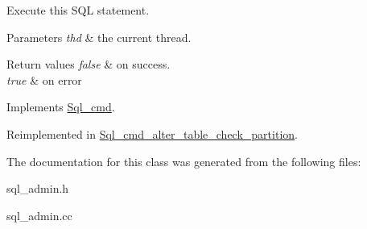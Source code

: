 Execute this S\+QL statement. 
\begin{DoxyParams}{Parameters}
{\em thd} & the current thread. \\
\hline
\end{DoxyParams}

\begin{DoxyRetVals}{Return values}
{\em false} & on success. \\
\hline
{\em true} & on error \\
\hline
\end{DoxyRetVals}


Implements \mbox{\hyperlink{classSql__cmd_a213367b79b551296fbb7790f2a3732fb}{Sql\+\_\+cmd}}.



Reimplemented in \mbox{\hyperlink{classSql__cmd__alter__table__check__partition_a8966c4ecbcc51851144d89eebe38b4d4}{Sql\+\_\+cmd\+\_\+alter\+\_\+table\+\_\+check\+\_\+partition}}.



The documentation for this class was generated from the following files\+:\begin{DoxyCompactItemize}
\item 
sql\+\_\+admin.\+h\item 
sql\+\_\+admin.\+cc\end{DoxyCompactItemize}
